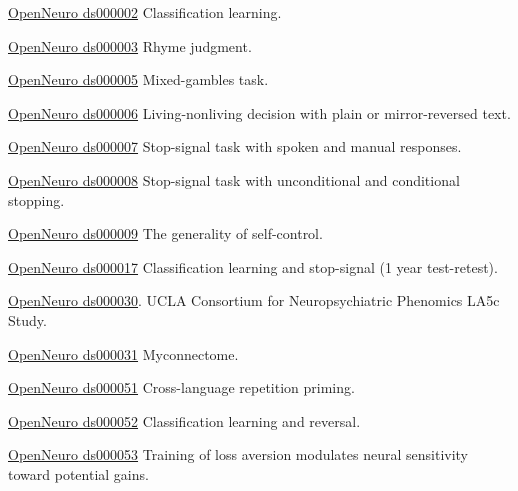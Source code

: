 \documentclass[10pt, letterpaper]{article}
\begin{document}
\href{https://openneuro.org/datasets/ds000002}{OpenNeuro ds000002} Classification learning.  \vspace{2mm}

\href{https://openneuro.org/datasets/ds000003}{OpenNeuro ds000003} Rhyme judgment.  \vspace{2mm}

\href{https://openneuro.org/datasets/ds000005}{OpenNeuro ds000005} Mixed-gambles task. \vspace{2mm}

\href{https://openneuro.org/datasets/ds000006}{OpenNeuro ds000006} Living-nonliving decision with plain or mirror-reversed text. \vspace{2mm}

\href{https://openneuro.org/datasets/ds000007}{OpenNeuro ds000007} Stop-signal task with spoken and manual responses. \vspace{2mm}

\href{https://openneuro.org/datasets/ds000008}{OpenNeuro ds000008} Stop-signal task with unconditional and conditional stopping. \vspace{2mm}

\href{https://openneuro.org/datasets/ds000009}{OpenNeuro ds000009} The generality of self-control. \vspace{2mm}

\href{https://openneuro.org/datasets/ds000017}{OpenNeuro ds000017} Classification learning and stop-signal (1 year test-retest). \vspace{2mm}

\href{https://openneuro.org/datasets/ds000030}{OpenNeuro ds000030}. UCLA Consortium for Neuropsychiatric Phenomics LA5c Study. \vspace{2mm}

\href{https://openneuro.org/datasets/ds000031}{OpenNeuro ds000031} Myconnectome.  \vspace{2mm}

\href{https://openneuro.org/datasets/ds000051}{OpenNeuro ds000051} Cross-language repetition priming.\vspace{2mm}

\href{https://openneuro.org/datasets/ds000052}{OpenNeuro ds000052} Classification learning and reversal.\vspace{2mm}

\href{https://openneuro.org/datasets/ds000053}{OpenNeuro ds000053} Training of loss aversion modulates neural sensitivity toward potential gains. \vspace{2mm}
\end{document}
